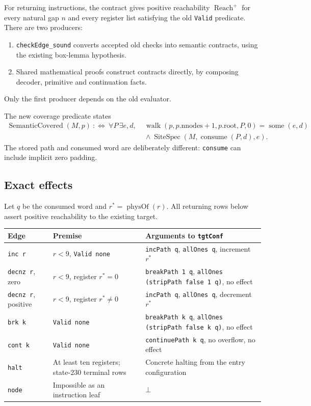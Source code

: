 \documentclass[11pt,letterpaper]{article}
\newcommand{\Reachp}{\operatorname{Reach}^{+}}
\newcommand{\Spec}{\operatorname{SiteSpec}}
\newcommand{\code}[1]{\texttt{#1}}
\begin{document}
For returning instructions, the contract gives positive reachability
\(\Reachp\) for every natural gap \(n\) and every register list satisfying the
old \code{Valid} predicate. There are two producers:
\begin{enumerate}
\item \code{checkEdge\_sound} converts accepted old checks into semantic contracts,
using the existing box-lemma hypothesis.
\item Shared mathematical proofs construct contracts directly, by composing
decoder, primitive and continuation facts.
\end{enumerate}
Only the first producer depends on the old evaluator.

The new coverage predicate states
\[
\begin{split}
 \operatorname{SemanticCovered}(M,p)\ :\Longleftrightarrow\
 \forall P\,\exists e,d,\;&
 \operatorname{walk}(p,p.\mathrm{nnodes}+1,p.\mathrm{root},P,0)
       =\operatorname{some}(e,d)\\
 &{}\land\Spec(M,\operatorname{consume}(P,d),e).
\end{split}
\]
The stored path and consumed word are deliberately different: \code{consume}
can include implicit zero padding.

\subsection{Exact effects}

Let \(q\) be the consumed word and \(r^\ast=\operatorname{physOf}(r)\).
All returning rows below assert positive reachability to the existing target.
\begin{center}\small
\begin{tabularx}{\textwidth}{p{}p{}X}
\toprule
Edge & Premise & Arguments to \code{tgtConf}\\
\midrule
\code{inc r} & \(r<9\), \code{Valid none} &
\code{incPath q}, \code{allOnes q}, increment \(r^\ast\)\\
\code{decnz r}, zero & \(r<9\), register \(r^\ast=0\) &
\code{breakPath 1 q}, \code{allOnes (stripPath false 1 q)}, no effect\\
\code{decnz r}, positive & \(r<9\), register \(r^\ast\ne0\) &
\code{incPath q}, \code{allOnes q}, decrement \(r^\ast\)\\
\code{brk k} & \code{Valid none} &
\code{breakPath k q}, \code{allOnes (stripPath false k q)}, no effect\\
\code{cont k} & \code{Valid none} &
\code{continuePath k q}, no overflow, no effect\\
\code{halt} & At least ten registers; state-230 terminal rows &
Concrete halting from the entry configuration\\
\code{node} & Impossible as an instruction leaf & \(\bot\)\\
\bottomrule
\end{tabularx}
\end{center}
\end{document}
